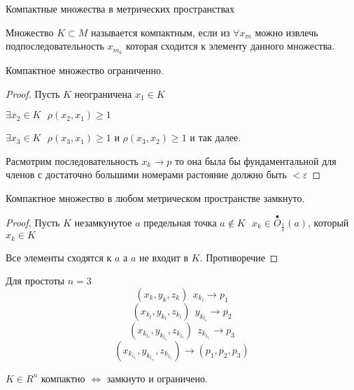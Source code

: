 \begin{title}[\Large]
  Компактные множества в метрических пространствах
\end{title}

\begin{define}
  Множество $K \subset M$ называется компактным, если из $\forall x_m$ можно
  извлечь подпоследовательность $x_{m_k}$ которая сходится к элементу данного
  множества.
\end{define}

\begin{theorem}
  Компактное множество ограниченно.
\end{theorem}

\begin{proof}
  Пусть $K$ неограничена $x_1 \in K$

  $\exists x_2 \in K ~~~ \rho(x_2, x_1) \ge 1$

  $\exists x_3 \in K ~~~ \rho(x_3, x_1) \ge 1$ и $\rho(x_3, x_2) \ge 1$ и так
  далее.

  Расмотрим последовательность $x_k \to p$ то она была бы фундаментальной для
  членов с достаточно большими номерами растояние должно быть $< \varepsilon$
\end{proof}

\begin{theorem}
  Компактное множество в любом метрическом пространстве замкнуто.
\end{theorem}

\begin{proof}
  Пусть $K$ незамкунутое $a$ предельная точка $a \not\in K ~~~
  x_k \in \stackrel{\bullet}{O}_{\frac{1}{k}}(a)$, который $x_k \in K$

  Все элементы сходятся к $a$ а $a$ не входит в $K$. Противоречие
\end{proof}

\begin{theorem}
  Для простоты $n = 3$
  $$
  (x_k, y_k, z_k) ~~ x_{k_l}\to p_1
  $$
  $$
  (x_{k_l}, y_{k_l}, z_{k_l}) ~~ y_{k_{l_s}} \to p_2
  $$
  $$
  (x_{k_{l_s}}, y_{k_{l_s}}, z_{k_{l_s}}) ~~ z_{k_{l_{s_i}}} \to p_3
  $$
  $$
  (x_{k_{l_{s_i}}}, y_{k_{l_{s_i}}}, z_{k_{l_{s_i}}}) \to (p_1, p_2, p_3)
  $$
\end{theorem}

\begin{block}[Критерий]
  $K \in R^n$ компактно $\Leftrightarrow$ замкнуто и ограничено.
\end{block}

